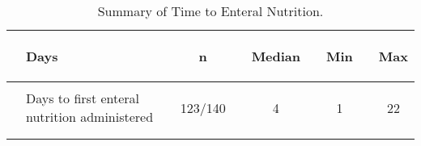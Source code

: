 \documentclass[dvips, 10pt]{article}
\begin{document}
\begin{table}[t]
\caption
{ Summary of Time to Enteral Nutrition. }
\begin{center}
\begin{tabular}{ @{}l@{}
@{}l@{}@{}p{1.5em}@{}@{}c@{}@{}p{1.5em}@{}@{}c@{}@{}p{1.5em}@{}@{}c@{}@{}p{1.5em}@{}@{}c@{}
}
\hline

& \parbox{6em}{\begin{center}Days\end{center}} && \parbox{6em}{\begin{center}n\end{center}} && \parbox{6em}{\begin{center}Median\end{center}} && \parbox{6em}{\begin{center}Min\end{center}} && \parbox{6em}{\begin{center}Max\end{center}} \\

\hline

\\
& Days to first enteral nutrition administered && 123/140 && 4 && 1 && 22 \\
\\
\hline \\

\end{tabular}

\end{center}
 \end{table}
\clearpage
\end{document}
